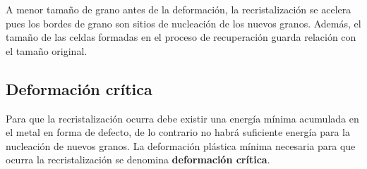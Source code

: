 A menor tamaño de grano antes de la deformación, la recristalización se acelera pues los bordes de grano son sitios de nucleación de los nuevos granos. Además, el tamaño de las celdas formadas en el proceso de recuperación guarda relación con el tamaño original.


\subsection{Deformación crítica}

Para que la recristalización ocurra debe existir una energía mínima acumulada en el metal en forma de defecto, de lo contrario no habrá suficiente energía para la nucleación de nuevos granos. La deformación plástica mínima necesaria para que ocurra la recristalización se denomina \textbf{deformación crítica}.





